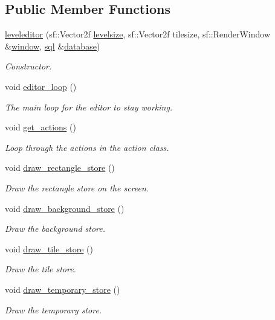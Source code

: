 \subsection*{Public Member Functions}
\begin{DoxyCompactItemize}
\item 
\hyperlink{classleveleditor_a5dfc809a9bac07ffa88ce921c077f017}{leveleditor} (sf\+::\+Vector2f \hyperlink{classleveleditor_ace10ab3736e90b40682ab9733b46d8f0}{levelsize}, sf\+::\+Vector2f tilesize, sf\+::\+Render\+Window \&\hyperlink{classleveleditor_a95edfc93a38089da61375eef9e65606e}{window}, \hyperlink{classsql}{sql} \&\hyperlink{classleveleditor_a1b1594767de698a60f38e91690a55a36}{database})
\begin{DoxyCompactList}\small\item\em Constructor. \end{DoxyCompactList}\item 
void \hyperlink{classleveleditor_a2ee968e4a8d305cdb1465397388b63f2}{editor\+\_\+loop} ()
\begin{DoxyCompactList}\small\item\em The main loop for the editor to stay working. \end{DoxyCompactList}\item 
void \hyperlink{classleveleditor_aa5cd17c0004af09a706230a93abb10ee}{get\+\_\+actions} ()
\begin{DoxyCompactList}\small\item\em Loop through the actions in the action class. \end{DoxyCompactList}\item 
void \hyperlink{classleveleditor_ae819c7275982ef9e2891017985560c6d}{draw\+\_\+rectangle\+\_\+store} ()
\begin{DoxyCompactList}\small\item\em Draw the rectangle store on the screen. \end{DoxyCompactList}\item 
void \hyperlink{classleveleditor_afa6c25fa02db7ad3d904d6bb91b79643}{draw\+\_\+background\+\_\+store} ()
\begin{DoxyCompactList}\small\item\em Draw the background store. \end{DoxyCompactList}\item 
void \hyperlink{classleveleditor_ac87f89b0889c243ab43cfbbc7fd70836}{draw\+\_\+tile\+\_\+store} ()
\begin{DoxyCompactList}\small\item\em Draw the tile store. \end{DoxyCompactList}\item 
void \hyperlink{classleveleditor_a3478cade84f5ff58c06df2c173c9127d}{draw\+\_\+temporary\+\_\+store} ()
\begin{DoxyCompactList}\small\item\em Draw the temporary store. \end{DoxyCompactList}\end{DoxyCompactItemize}

